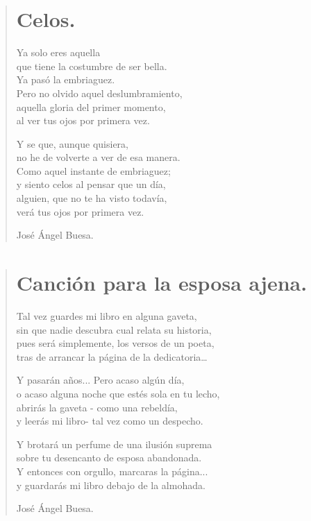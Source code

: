 \documentclass[11pt, portrait, twoside, notitlepage, openright]{book}
\begin{document}
\newpage
\begin{verse}
\begin{center}
\section{Celos.}
\end{center}

Ya solo eres aquella\\
que tiene la costumbre de ser bella.\\
Ya pasó la embriaguez.\\
Pero no olvido aquel deslumbramiento,\\
aquella gloria del primer momento,\\
al ver tus ojos por primera vez.
\newline

Y se que, aunque quisiera,\\
no he de volverte a ver de esa manera.\\
Como aquel instante de embriaguez;\\
y siento celos al pensar que un día,\\
alguien, que no te ha visto todavía,\\
verá tus ojos por primera vez.
\newline

José Ángel Buesa.
\end{verse}

\newpage
\begin{verse}
\begin{center}
\section{Canción para la esposa ajena.}
\end{center}
Tal vez guardes mi libro en alguna gaveta,\\
sin que nadie descubra cual relata su historia,\\
pues será simplemente, los versos de un poeta,\\
tras de arrancar la página de la dedicatoria…
\newline

Y pasarán años... Pero acaso algún día,\\
o acaso alguna noche que estés sola en tu lecho,\\
abrirás la gaveta - como una rebeldía,\\
y leerás mi libro- tal vez como un despecho.
\newline

Y brotará un perfume de una ilusión suprema\\
sobre tu desencanto de esposa abandonada.\\
Y entonces con orgullo, marcaras la página...\\
y guardarás mi libro debajo de la almohada.
\newline

José Ángel Buesa.
\end{verse}
\end{document}
